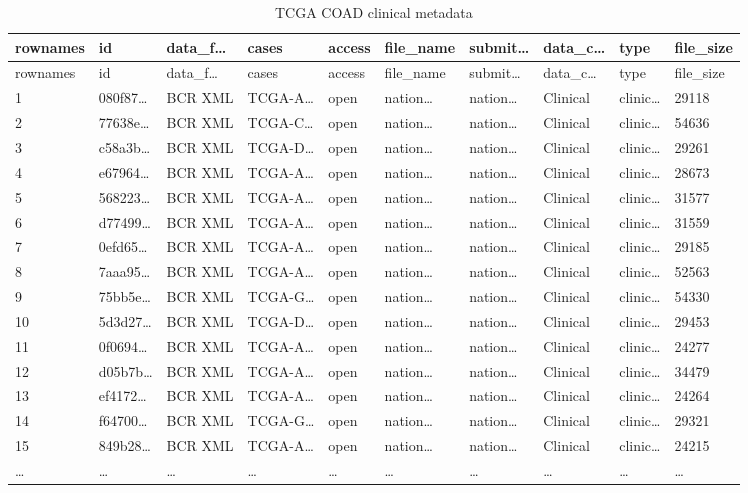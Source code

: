 \documentclass[
]{article}
\begin{document}
\begin{longtable}[]{@{}llllllllll@{}}
\caption{\label{tab:TCGA-COAD-clinical-metadata}TCGA COAD clinical metadata}\tabularnewline
\toprule
rownames & id & data\_f\ldots{} & cases & access & file\_name & submit\ldots{} & data\_c\ldots{} & type & file\_size\tabularnewline
\midrule
\endfirsthead
\toprule
rownames & id & data\_f\ldots{} & cases & access & file\_name & submit\ldots{} & data\_c\ldots{} & type & file\_size\tabularnewline
\midrule
\endhead
1 & 080f87\ldots{} & BCR XML & TCGA-A\ldots{} & open & nation\ldots{} & nation\ldots{} & Clinical & clinic\ldots{} & 29118\tabularnewline
2 & 77638e\ldots{} & BCR XML & TCGA-C\ldots{} & open & nation\ldots{} & nation\ldots{} & Clinical & clinic\ldots{} & 54636\tabularnewline
3 & c58a3b\ldots{} & BCR XML & TCGA-D\ldots{} & open & nation\ldots{} & nation\ldots{} & Clinical & clinic\ldots{} & 29261\tabularnewline
4 & e67964\ldots{} & BCR XML & TCGA-A\ldots{} & open & nation\ldots{} & nation\ldots{} & Clinical & clinic\ldots{} & 28673\tabularnewline
5 & 568223\ldots{} & BCR XML & TCGA-A\ldots{} & open & nation\ldots{} & nation\ldots{} & Clinical & clinic\ldots{} & 31577\tabularnewline
6 & d77499\ldots{} & BCR XML & TCGA-A\ldots{} & open & nation\ldots{} & nation\ldots{} & Clinical & clinic\ldots{} & 31559\tabularnewline
7 & 0efd65\ldots{} & BCR XML & TCGA-A\ldots{} & open & nation\ldots{} & nation\ldots{} & Clinical & clinic\ldots{} & 29185\tabularnewline
8 & 7aaa95\ldots{} & BCR XML & TCGA-A\ldots{} & open & nation\ldots{} & nation\ldots{} & Clinical & clinic\ldots{} & 52563\tabularnewline
9 & 75bb5e\ldots{} & BCR XML & TCGA-G\ldots{} & open & nation\ldots{} & nation\ldots{} & Clinical & clinic\ldots{} & 54330\tabularnewline
10 & 5d3d27\ldots{} & BCR XML & TCGA-D\ldots{} & open & nation\ldots{} & nation\ldots{} & Clinical & clinic\ldots{} & 29453\tabularnewline
11 & 0f0694\ldots{} & BCR XML & TCGA-A\ldots{} & open & nation\ldots{} & nation\ldots{} & Clinical & clinic\ldots{} & 24277\tabularnewline
12 & d05b7b\ldots{} & BCR XML & TCGA-A\ldots{} & open & nation\ldots{} & nation\ldots{} & Clinical & clinic\ldots{} & 34479\tabularnewline
13 & ef4172\ldots{} & BCR XML & TCGA-A\ldots{} & open & nation\ldots{} & nation\ldots{} & Clinical & clinic\ldots{} & 24264\tabularnewline
14 & f64700\ldots{} & BCR XML & TCGA-G\ldots{} & open & nation\ldots{} & nation\ldots{} & Clinical & clinic\ldots{} & 29321\tabularnewline
15 & 849b28\ldots{} & BCR XML & TCGA-A\ldots{} & open & nation\ldots{} & nation\ldots{} & Clinical & clinic\ldots{} & 24215\tabularnewline
\ldots{} & \ldots{} & \ldots{} & \ldots{} & \ldots{} & \ldots{} & \ldots{} & \ldots{} & \ldots{} & \ldots{}\tabularnewline
\bottomrule
\end{longtable}
\end{document}
